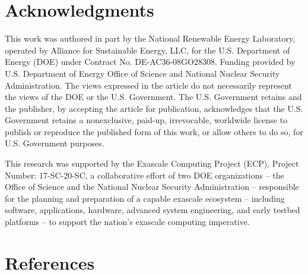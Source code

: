 \documentclass[review]{elsarticle}
\begin{document}
\section*{Acknowledgments}
This work was authored in part by the National Renewable Energy Laboratory, operated by Alliance for Sustainable Energy, LLC, for the U.S. Department of Energy (DOE) under Contract No. DE-AC36-08GO28308. Funding provided by U.S. Department of Energy Office of Science and National Nuclear Security Administration. The views expressed in the article do not necessarily represent the views of the DOE or the U.S. Government. The U.S. Government retains and the publisher, by accepting the article for publication, acknowledges that the U.S. Government retains a nonexclusive, paid-up, irrevocable, worldwide license to publish or reproduce the published form of this work, or allow others to do so, for U.S. Government purposes.

This research was supported by the Exascale Computing Project (ECP), Project Number: 17-SC-20-SC, a collaborative effort of two DOE organizations -- the Office of Science and the National Nuclear Security Administration -- responsible for the planning and preparation of a capable exascale ecosystem -- including software, applications, hardware, advanced system engineering, and early testbed platforms -- to support the nation's exascale computing imperative.

\section*{References}


\end{document}

